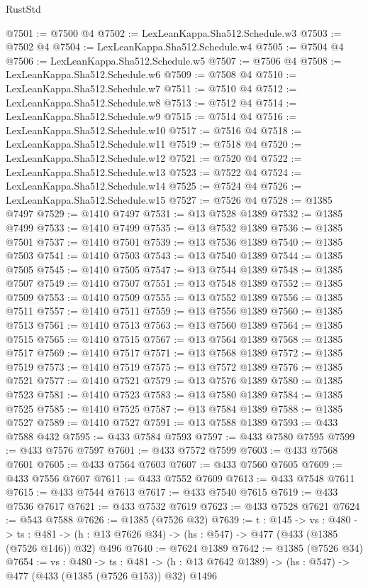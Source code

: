 \begin{lexlean}{RustStd}
\begin{coremodule}
{\begin{coremodule}
{{{{{{{{{{{{{{{{@7501 := @7500 @4
@7502 := LexLeanKappa.Sha512.Schedule.w3
@7503 := @7502 @4
@7504 := LexLeanKappa.Sha512.Schedule.w4
@7505 := @7504 @4
@7506 := LexLeanKappa.Sha512.Schedule.w5
@7507 := @7506 @4
@7508 := LexLeanKappa.Sha512.Schedule.w6
@7509 := @7508 @4
@7510 := LexLeanKappa.Sha512.Schedule.w7
@7511 := @7510 @4
@7512 := LexLeanKappa.Sha512.Schedule.w8
@7513 := @7512 @4
@7514 := LexLeanKappa.Sha512.Schedule.w9
@7515 := @7514 @4
@7516 := LexLeanKappa.Sha512.Schedule.w10
@7517 := @7516 @4
@7518 := LexLeanKappa.Sha512.Schedule.w11
@7519 := @7518 @4
@7520 := LexLeanKappa.Sha512.Schedule.w12
@7521 := @7520 @4
@7522 := LexLeanKappa.Sha512.Schedule.w13
@7523 := @7522 @4
@7524 := LexLeanKappa.Sha512.Schedule.w14
@7525 := @7524 @4
@7526 := LexLeanKappa.Sha512.Schedule.w15
@7527 := @7526 @4
@7528 := @1385 @7497
@7529 := @1410 @7497
@7531 := @13 @7528 @1389
@7532 := @1385 @7499
@7533 := @1410 @7499
@7535 := @13 @7532 @1389
@7536 := @1385 @7501
@7537 := @1410 @7501
@7539 := @13 @7536 @1389
@7540 := @1385 @7503
@7541 := @1410 @7503
@7543 := @13 @7540 @1389
@7544 := @1385 @7505
@7545 := @1410 @7505
@7547 := @13 @7544 @1389
@7548 := @1385 @7507
@7549 := @1410 @7507
@7551 := @13 @7548 @1389
@7552 := @1385 @7509
@7553 := @1410 @7509
@7555 := @13 @7552 @1389
@7556 := @1385 @7511
@7557 := @1410 @7511
@7559 := @13 @7556 @1389
@7560 := @1385 @7513
@7561 := @1410 @7513
@7563 := @13 @7560 @1389
@7564 := @1385 @7515
@7565 := @1410 @7515
@7567 := @13 @7564 @1389
@7568 := @1385 @7517
@7569 := @1410 @7517
@7571 := @13 @7568 @1389
@7572 := @1385 @7519
@7573 := @1410 @7519
@7575 := @13 @7572 @1389
@7576 := @1385 @7521
@7577 := @1410 @7521
@7579 := @13 @7576 @1389
@7580 := @1385 @7523
@7581 := @1410 @7523
@7583 := @13 @7580 @1389
@7584 := @1385 @7525
@7585 := @1410 @7525
@7587 := @13 @7584 @1389
@7588 := @1385 @7527
@7589 := @1410 @7527
@7591 := @13 @7588 @1389
@7593 := @433 @7588 @432
@7595 := @433 @7584 @7593
@7597 := @433 @7580 @7595
@7599 := @433 @7576 @7597
@7601 := @433 @7572 @7599
@7603 := @433 @7568 @7601
@7605 := @433 @7564 @7603
@7607 := @433 @7560 @7605
@7609 := @433 @7556 @7607
@7611 := @433 @7552 @7609
@7613 := @433 @7548 @7611
@7615 := @433 @7544 @7613
@7617 := @433 @7540 @7615
@7619 := @433 @7536 @7617
@7621 := @433 @7532 @7619
@7623 := @433 @7528 @7621
@7624 := @543 @7588
@7626 := @1385 (@7526 @32)
@7639 := {t : @145} ->
  {vs : @480} ->
  {ts : @481} -> (h : @13 @7626 @34) -> (hs : @547) -> @477 (@433 (@1385 (@7526 @146)) @32) @496
@7640 := @7624 @1389
@7642 := @1385 (@7526 @34)
@7654 := {vs : @480} ->
  {ts : @481} -> (h : @13 @7642 @1389) -> (hs : @547) -> @477 (@433 (@1385 (@7526 @153)) @32) @1496
}}}}}}}}}}}}}}}}
\end{coremodule}}
\end{coremodule}
\end{lexlean}
